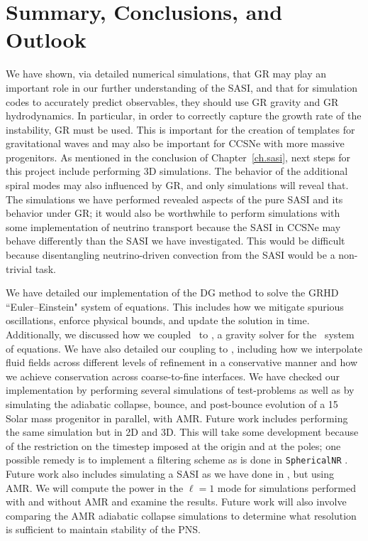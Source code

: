 \chapter{Summary, Conclusions, and Outlook}
\label{ch.con}

We have shown, via detailed numerical simulations, that GR may play an
important role in our further understanding of the SASI, and that for simulation codes to
accurately predict observables, they should use GR gravity and GR hydrodynamics.
In particular, in order to correctly capture the growth rate of the
instability, GR must be used.
This is important for the creation of templates for gravitational waves
and may also be important for CCSNe with more massive progenitors.
As mentioned in the conclusion of Chapter~\ref{ch.sasi},
next steps for this project include performing 3D simulations.
The behavior of the additional spiral modes may also influenced by GR,
and only simulations will reveal that.
The simulations we have performed revealed aspects of the pure SASI and its
behavior under GR;
it would also be worthwhile to perform simulations with some implementation of
neutrino transport because the SASI in CCSNe may behave differently than
the SASI we have investigated.
This would be difficult because disentangling neutrino-driven convection
from the SASI would be a non-trivial task.

We have detailed our implementation of the DG method to solve the GRHD
``Euler--Einstein" system of equations.
This includes how we mitigate spurious oscillations,
enforce physical bounds, and update the solution in time.
Additionally, we discussed how we coupled \thornado\ to \poseidon,
a gravity solver for the \xcfc\ system of equations.
We have also detailed our coupling to \amrex, including how we interpolate
fluid fields across different levels of refinement in a conservative manner
and how we achieve conservation across coarse-to-fine interfaces.
We have checked our implementation by performing several
simulations of test-problems as well as by simulating the adiabatic collapse,
bounce, and
post-bounce evolution of a 15 Solar mass progenitor in parallel, with AMR.
Future work includes performing the same simulation but in 2D and 3D.
This will take some development because of the restriction on the timestep
imposed at the origin and at the poles;
one possible remedy is to implement a filtering scheme as is done in
\texttt{SphericalNR} \citep{jmz2023}.
Future work also includes
simulating a SASI as we have done in \citet{dem2023}, but using AMR.
We will compute the power in the $\ell=1$ mode for simulations performed
with and without AMR and examine the results.
Future work will also involve comparing the AMR adiabatic collapse simulations
to determine what resolution is sufficient to maintain stability of the PNS.

